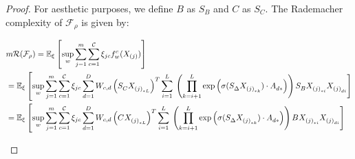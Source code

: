 \begin{proof}
For aesthetic purposes, we define \( B \) as \( S_B \) and \( C \) as \( S_C \).
The Rademacher complexity of $\mathcal{F}_{\rho}$ is given by:
\begin{small}
\begin{equation*}
\begin{aligned}
&m\mathcal{R(\mathcal{F}_{\rho})} = \mathbb{E}_{\xi}\left[\sup_{w} \sum_{j=1}^m \sum_{c=1}^{\mathcal{C}} \xi_{jc} f^c_w(X_{(j)}) \right] \\
&= \mathbb{E}_{\xi}\left[\sup_{w} \sum_{j=1}^m \sum_{c=1}^{\mathcal{C}} \xi_{jc} \sum_{d=1}^D W_{c,d} 
\left(S_C^{} X^{}_{{(j)}_{*L}}\right)^T \sum_{i=1}^L \right. \left.\left(\prod_{k=i+1}^L \exp\left(\sigma(S^{}_{\Delta} X^{}_{{(j)}_{*k}}) 
\cdot A^{}_{d*}\right)\right) S_B^{} X^{}_{{(j)}_{*i}} X^{}_{{(j)}_{di}} \right] \\
&= \mathbb{E}_{\xi}\left[\sup_{w} \sum_{j=1}^m \sum_{c=1}^{\mathcal{C}} \xi_{jc} \sum_{d=1}^D W_{c,d} 
\left(C^{} X^{}_{{(j)}_{*L}}\right)^T \sum_{i=1}^L \right. \left.\left(\prod_{k=i+1}^L \exp\left(\sigma(S^{}_{\Delta} X^{}_{{(j)}_{*k}}) 
\cdot A^{}_{d*}\right)\right) B^{} X^{}_{{(j)}_{*i}} X^{}_{{(j)}_{di}} \right] 
\end{aligned}
\end{equation*}
\end{small}


\end{proof}
